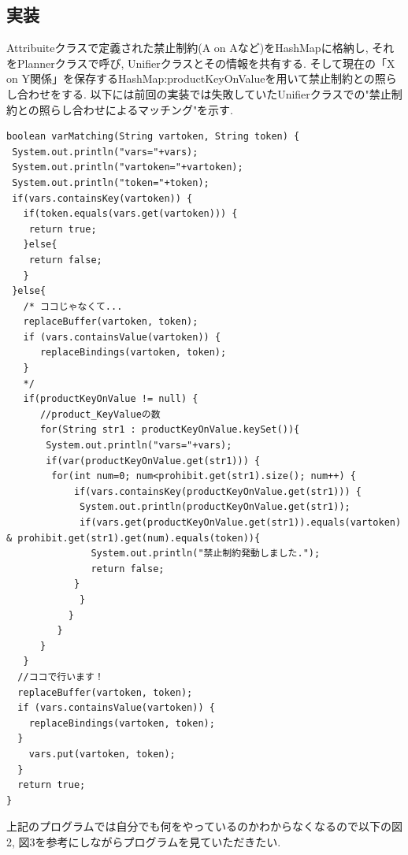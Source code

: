 \documentclass[uplatex,12pt]{jsarticle}
\begin{document}
\subsection{実装}
Attribuiteクラスで定義された禁止制約(A on Aなど)をHashMapに格納し, それをPlannerクラスで呼び, Unifierクラスとその情報を共有する. そして現在の「X on Y関係」を保存するHashMap:productKeyOnValueを用いて禁止制約との照らし合わせをする. 以下には前回の実装では失敗していたUnifierクラスでの"禁止制約との照らし合わせによるマッチング"を示す.
\begin{lstlisting}[caption=UnifierクラスのvarMatchingメソッド, label=src:No1]
boolean varMatching(String vartoken, String token) {
 System.out.println("vars="+vars);
 System.out.println("vartoken="+vartoken);
 System.out.println("token="+token);
 if(vars.containsKey(vartoken)) {
   if(token.equals(vars.get(vartoken))) {
	return true;
   }else{
	return false;
   }
 }else{
   /* ココじゃなくて...
   replaceBuffer(vartoken, token);
   if (vars.containsValue(vartoken)) {
      replaceBindings(vartoken, token);
   }
   */
   if(productKeyOnValue != null) {
      //product_KeyValueの数
      for(String str1 : productKeyOnValue.keySet()){	
	   System.out.println("vars="+vars);
	   if(var(productKeyOnValue.get(str1))) {
		for(int num=0; num<prohibit.get(str1).size(); num++) {
		    if(vars.containsKey(productKeyOnValue.get(str1))) {
		     System.out.println(productKeyOnValue.get(str1));
		     if(vars.get(productKeyOnValue.get(str1)).equals(vartoken) & prohibit.get(str1).get(num).equals(token)){
			   System.out.println("禁止制約発動しました.");
			   return false;
			}
		     }
	       }
	     }
      }
   }
  //ココで行います！
  replaceBuffer(vartoken, token);
  if (vars.containsValue(vartoken)) {
	replaceBindings(vartoken, token);
  }
	vars.put(vartoken, token);
  }
  return true;
}
\end{lstlisting}

上記のプログラムでは自分でも何をやっているのかわからなくなるので以下の図2, 図3を参考にしながらプログラムを見ていただきたい.
\end{document}
